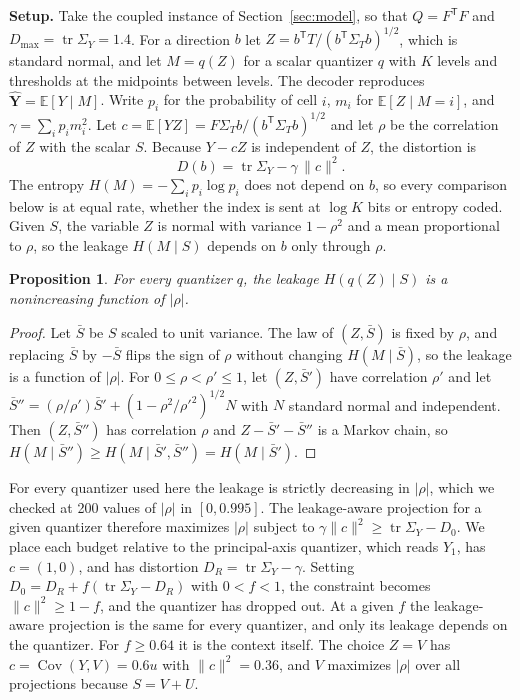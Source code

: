 \documentclass[11pt,onecolumn]{IEEEtran}
\newtheorem{proposition}[theorem]{Proposition}
\newcommand{\E}{\mathbb{E}}
\newcommand{\tr}{\operatorname{tr}}
\newcommand{\Cov}{\operatorname{Cov}}
\newcommand{\hY}{\hat{\mathbf Y}}
\begin{document}
\textbf{Setup.} Take the coupled instance of Section~\ref{sec:model},
so that $Q=F^{\mathsf T}F$ and $D_{\max}=\tr\Sigma_Y=1.4$. For a direction
$b$ let $Z=b^{\mathsf T}T/(b^{\mathsf T}\Sigma_Tb)^{1/2}$, which is standard
normal, and let $M=q(Z)$ for a scalar quantizer $q$ with $K$ levels and
thresholds at the midpoints between levels. The decoder reproduces
$\hY=\E[Y\mid M]$. Write $p_i$ for the probability of cell $i$, $m_i$ for
$\E[Z\mid M=i]$, and $\gamma=\sum_ip_im_i^2$. Let
$c=\E[YZ]=F\Sigma_Tb/(b^{\mathsf T}\Sigma_Tb)^{1/2}$ and let $\rho$ be the
correlation of $Z$ with the scalar $S$. Because $Y-cZ$ is independent of
$Z$, the distortion is
\[
D(b)=\tr\Sigma_Y-\gamma\,\|c\|^2 .
\]
The entropy $H(M)=-\sum_ip_i\log p_i$ does not depend on $b$, so every
comparison below is at equal rate, whether the index is sent at
$\log K$ bits or entropy coded. Given $S$, the variable $Z$ is normal
with variance $1-\rho^2$ and a mean proportional to $\rho$, so the
leakage $H(M\mid S)$ depends on $b$ only through $\rho$.

\begin{proposition}\label{prop:quant}
For every quantizer $q$, the leakage $H(q(Z)\mid S)$ is a nonincreasing
function of $|\rho|$.
\end{proposition}

\begin{proof}
Let $\bar S$ be $S$ scaled to unit variance. The law of $(Z,\bar S)$ is
fixed by $\rho$, and replacing $\bar S$ by $-\bar S$ flips the sign of
$\rho$ without changing $H(M\mid\bar S)$, so the leakage is a function of
$|\rho|$. For $0\le\rho<\rho'\le1$, let $(Z,\bar S')$ have correlation
$\rho'$ and let
$\bar S''=(\rho/\rho')\bar S'+(1-\rho^2/\rho'^2)^{1/2}N$ with $N$ standard
normal and independent. Then $(Z,\bar S'')$ has correlation $\rho$ and
$Z-\bar S'-\bar S''$ is a Markov chain, so
$H(M\mid\bar S'')\ge H(M\mid\bar S',\bar S'')=H(M\mid\bar S')$.
\end{proof}

For every quantizer used here the leakage is strictly decreasing in
$|\rho|$, which we checked at 200 values of $|\rho|$ in $[0,0.995]$. The
leakage-aware projection for a given quantizer therefore maximizes
$|\rho|$ subject to $\gamma\|c\|^2\ge\tr\Sigma_Y-D_0$. We place each
budget relative to the principal-axis quantizer, which reads $Y_1$, has
$c=(1,0)$, and has distortion $D_R=\tr\Sigma_Y-\gamma$. Setting
$D_0=D_R+f(\tr\Sigma_Y-D_R)$ with $0<f<1$, the constraint becomes
$\|c\|^2\ge1-f$, and the quantizer has dropped out. At a given $f$ the
leakage-aware projection is the same for every quantizer, and only its
leakage depends on the quantizer. For $f\ge0.64$ it is the context
itself. The choice $Z=V$ has $c=\Cov(Y,V)=0.6u$ with $\|c\|^2=0.36$, and
$V$ maximizes $|\rho|$ over all projections because $S=V+U$.
\end{document}
